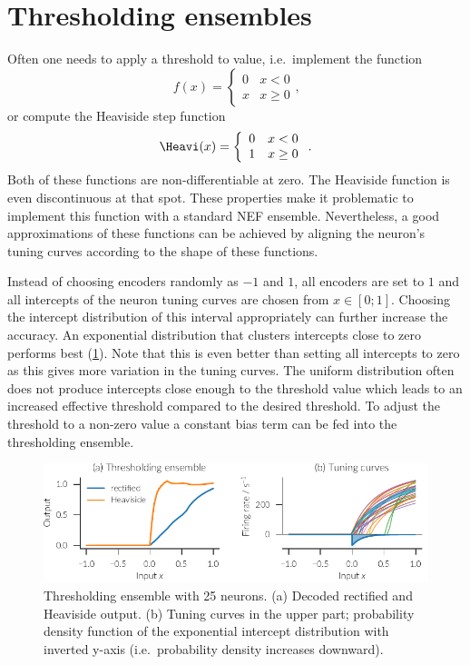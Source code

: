 \section{Thresholding ensembles}\label{sec:thresholding}
Often one needs to apply a threshold to value, i.e.\ implement the function
\begin{equation}
    f(x) = \left\{ \begin{array}{ll}
            0 & x < 0 \\
            x & x \geq 0
        \end{array} \right.
    \text{,}
\end{equation}
or compute the Heaviside step function
\begin{equation}
    \Heavi(x) = \left\{ \begin{array}{ll}
            0 & x < 0 \\
            1 & x \geq 0
        \end{array} \right.
    \text{.}
\end{equation}
Both of these functions are non-differentiable at zero.
The Heaviside function is even discontinuous at that spot.
These properties make it problematic to implement this function with a standard NEF ensemble.
Nevertheless, a good approximations of these functions can be achieved by aligning the neuron's tuning curves according to the shape of these functions.

Instead of choosing encoders randomly as $-1$ and $1$, all encoders are set to $1$ and all intercepts of the neuron tuning curves are chosen from $x \in [0; 1]$.
Choosing the intercept distribution of this interval appropriately can further increase the accuracy.
An exponential distribution that clusters intercepts close to zero performs best (\cref{fig:thresholding}).
Note that this is even better than setting all intercepts to zero as this gives more variation in the tuning curves.
The uniform distribution often does not produce intercepts close enough to the threshold value which leads to an increased effective threshold compared to the desired threshold.
To adjust the threshold to a non-zero value a constant bias term can be fed into the thresholding ensemble.
\begin{figure}
    \centering
    \includegraphics{figures/thresholding}
    \caption[Thresholding ensemble.]{Thresholding ensemble with 25 neurons. (a) Decoded rectified and Heaviside output.  (b) Tuning curves in the upper part; probability density function of the exponential intercept distribution with inverted y-axis (i.e.\ probability density increases downward).}\label{fig:thresholding}
\end{figure}


